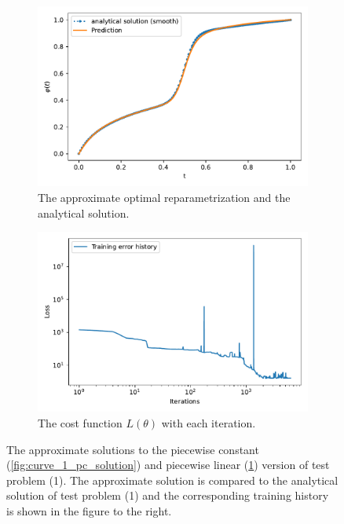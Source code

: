 \begin{figure}[t]
\begin{subfigure}[t]{0.5\textwidth}
        \includegraphics[width=\linewidth]{figures/curve_1_pl/exp_2/plot_0_0.pdf}
        \caption{The approximate optimal reparametrization and the analytical solution.}
        \label{fig:curve_1_pl_solution}
    \end{subfigure}
    \begin{subfigure}[t]{0.5\textwidth}
        \centering
        \includegraphics[width=\linewidth]{figures/curve_1_pl/exp_2/history_plot_0.pdf}
        \caption{The cost function \(L(\theta)\) with each iteration.}
        \label{fig:curve_1_pl_history}
    \end{subfigure}
    \caption{The approximate solutions to the piecewise constant (\ref{fig:curve_1_pc_solution}) and piecewise linear (\ref{fig:curve_1_pl_solution}) version of test problem (1). The approximate solution is compared to the analytical solution of test problem (1) and the corresponding training history is shown in the figure to the right.}
\end{figure}

